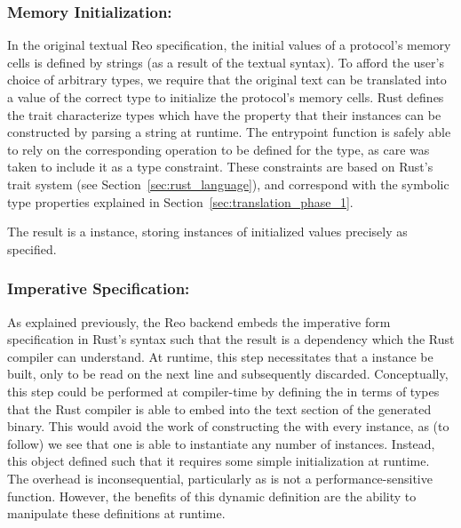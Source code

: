 \subsubsection{Memory Initialization: }



In the original textual Reo specification, the initial values of a protocol's memory cells is defined by strings (as a result of the textual syntax). To afford the user's choice of arbitrary types, we require that the original text can be translated into a value of the correct type to initialize the protocol's memory cells. Rust defines the  trait characterize types which have the property that their instances can be constructed by parsing a string at runtime. The entrypoint function is safely able to rely on the corresponding  operation to be defined for the type, as care was taken to include it as a type constraint. These constraints are based on Rust's trait system (see Section~\ref{sec:rust_language}), and correspond with the symbolic type properties explained in Section~\ref{sec:translation_phase_1}.

The result is a  instance, storing instances of initialized values precisely as specified.

\subsubsection{Imperative Specification: }
As explained previously, the Reo backend embeds the imperative form specification in Rust's syntax such that the result is a dependency which the Rust compiler can understand. At runtime, this step necessitates that a  instance be built, only to be read on the next line and subsequently discarded. Conceptually, this step could be performed at compiler-time by defining the  in terms of types that the Rust compiler is able to embed into the text section of the generated binary. This would avoid the work of constructing the  with every instance, as (to follow) we see that one  is able to instantiate any number of  instances. Instead, this object defined such that it requires some simple initialization at runtime. The overhead is inconsequential, particularly as  is not a performance-sensitive function. However, the benefits of this dynamic definition are the ability to manipulate these definitions at runtime. 

